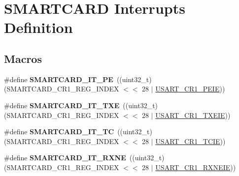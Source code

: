 \hypertarget{group___smart_card___interrupt__definition}{}\section{S\+M\+A\+R\+T\+C\+A\+RD Interrupts Definition}
\label{group___smart_card___interrupt__definition}
\subsection*{Macros}
\begin{DoxyCompactItemize}
\item 
\#define {\bfseries S\+M\+A\+R\+T\+C\+A\+R\+D\+\_\+\+I\+T\+\_\+\+PE}~((uint32\+\_\+t)(S\+M\+A\+R\+T\+C\+A\+R\+D\+\_\+\+C\+R1\+\_\+\+R\+E\+G\+\_\+\+I\+N\+D\+EX $<$$<$ 28 $\vert$ \hyperlink{group___peripheral___registers___bits___definition_ga27405d413b6d355ccdb076d52fef6875}{U\+S\+A\+R\+T\+\_\+\+C\+R1\+\_\+\+P\+E\+IE}))\hypertarget{group___smart_card___interrupt__definition_gac56e07a71ab82a23930ad58e9a8dc806}{}\label{group___smart_card___interrupt__definition_gac56e07a71ab82a23930ad58e9a8dc806}

\item 
\#define {\bfseries S\+M\+A\+R\+T\+C\+A\+R\+D\+\_\+\+I\+T\+\_\+\+T\+XE}~((uint32\+\_\+t)(S\+M\+A\+R\+T\+C\+A\+R\+D\+\_\+\+C\+R1\+\_\+\+R\+E\+G\+\_\+\+I\+N\+D\+EX $<$$<$ 28 $\vert$ \hyperlink{group___peripheral___registers___bits___definition_ga70422871d15f974b464365e7fe1877e9}{U\+S\+A\+R\+T\+\_\+\+C\+R1\+\_\+\+T\+X\+E\+IE}))\hypertarget{group___smart_card___interrupt__definition_ga758561a96d28254dc3504cb5325dad1f}{}\label{group___smart_card___interrupt__definition_ga758561a96d28254dc3504cb5325dad1f}

\item 
\#define {\bfseries S\+M\+A\+R\+T\+C\+A\+R\+D\+\_\+\+I\+T\+\_\+\+TC}~((uint32\+\_\+t)(S\+M\+A\+R\+T\+C\+A\+R\+D\+\_\+\+C\+R1\+\_\+\+R\+E\+G\+\_\+\+I\+N\+D\+EX $<$$<$ 28 $\vert$ \hyperlink{group___peripheral___registers___bits___definition_gaa17130690a1ca95b972429eb64d4254e}{U\+S\+A\+R\+T\+\_\+\+C\+R1\+\_\+\+T\+C\+IE}))\hypertarget{group___smart_card___interrupt__definition_ga808ee7d7c209374af004e8bf1d2ca492}{}\label{group___smart_card___interrupt__definition_ga808ee7d7c209374af004e8bf1d2ca492}

\item 
\#define {\bfseries S\+M\+A\+R\+T\+C\+A\+R\+D\+\_\+\+I\+T\+\_\+\+R\+X\+NE}~((uint32\+\_\+t)(S\+M\+A\+R\+T\+C\+A\+R\+D\+\_\+\+C\+R1\+\_\+\+R\+E\+G\+\_\+\+I\+N\+D\+EX $<$$<$ 28 $\vert$ \hyperlink{group___peripheral___registers___bits___definition_ga91118f867adfdb2e805beea86666de04}{U\+S\+A\+R\+T\+\_\+\+C\+R1\+\_\+\+R\+X\+N\+E\+IE}))\hypertarget{group___smart_card___interrupt__definition_ga75b6c6e283a114afa1130f6f1bc98da6}{}\label{group___smart_card___interrupt__definition_ga75b6c6e283a114afa1130f6f1bc98da6}


\end{DoxyCompactItemize}
